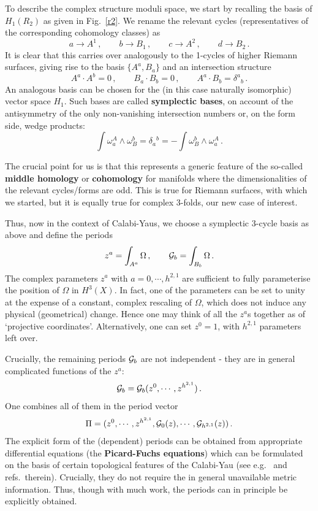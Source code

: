 \documentclass[12pt]{article}
\newcommand{\be}{\begin{equation}}
\newcommand{\ee}{\end{equation}}
\numberwithin{equation}{section}
\begin{document}
To describe the complex structure moduli space, we start by recalling the basis of $H_1(R_2)$ as given in Fig.~\ref{r2}. We rename the relevant cycles (representatives of the corresponding cohomology classes) as
\be
a \to A^1\,,\qquad b\to B_1\,,\qquad c\to A^2\,,\qquad d\to B_2\,.
\ee
It is clear that this carries over analogously to the 1-cycles of higher Riemann surfaces, giving rise to the basis $\{A^a,B_a\}$ and an intersection structure
\be
A^a\cdot A^b=0\,,\qquad B_a\cdot B_b=0\,,\qquad A^a\cdot B_b=\delta^a{}_b\,.
\ee
An analogous basis can be chosen for the (in this case naturally isomorphic) vector space $H_1$. Such bases are called {\bf symplectic bases}, on account of the antisymmetry of the only non-vanishing intersection numbers or, on the form side, wedge products:
\be
\int \omega^A_a\wedge \omega_B^b=\delta_a{}^b
=-\int \omega_B^b \wedge \omega^A_a\,.
\ee

The crucial point for us is that this represents a generic feature of the so-called {\bf middle homology} or {\bf cohomology} for manifolds where the dimensionalities of the relevant cycles/forms are odd. This is true for Riemann surfaces, with which we started, but it is equally true for complex 3-folds, our new case of interest. 

Thus, now in the context of Calabi-Yaus, we choose a symplectic 3-cycle basis as above and define the periods
\be
z^a=\int_{A^a}\Omega\,,\qquad {\cal G}_b=\int_{B_b}\Omega\,.
\ee
The complex parameters $z^a$ with $a=0,\cdots, h^{2,1}$ are sufficient to fully parameterise the position of $\Omega$ in $H^3(X)$. In fact, one of the parameters can be set to unity at the expense of a constant, complex rescaling of $\Omega$, which does not induce any physical (geometrical) change. Hence one may think of all the $z^a$s together as of `projective coordinates'. Alternatively, one can set $z^0=1$, with $h^{2,1}$ parameters left over. 

Crucially, the remaining periods ${\cal G}_b$ are not independent - they are in general complicated functions of the $z^a$:
\be
{\cal G}_b={\cal G}_b(z^0,\cdots,z^{h^{2,1}})\,.
\ee
One combines all of them in the period vector
\be
\Pi=(z^0,\cdots,z^{h^{2,1}},{\cal G}_0(z),\cdots,{\cal G}_{h^{2,1}}(z))\,.
\ee
The explicit form of the (dependent) periods can be obtained from appropriate differential equations (the {\bf Picard-Fuchs equations}) which can be formulated on the basis of certain topological features of the Calabi-Yau (see e.g.~\cite{Klemm:1992tx, fre} and refs.~therein). Crucially, they do not require the in general unavailable metric information. Thus, though with much work, the periods can in principle be explicitly obtained. 
\end{document}
